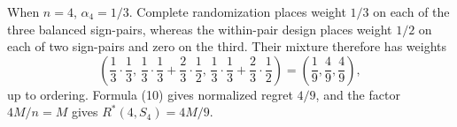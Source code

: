 When \(n=4\), \(\alpha_4=1/3\).  Complete randomization places weight \(1/3\) on each of the three balanced sign-pairs, whereas the within-pair design places weight \(1/2\) on each of two sign-pairs and zero on the third.  Their mixture therefore has weights
\[
 \left(\frac13\cdot\frac13,\,
 \frac13\cdot\frac13+\frac23\cdot\frac12,\,
 \frac13\cdot\frac13+\frac23\cdot\frac12\right)
 =\left(\frac19,\frac49,\frac49\right),
\]
up to ordering.  Formula (10) gives normalized regret \(4/9\), and the factor \(4M/n=M\) gives \(R^*(4,S_4)=4M/9\).